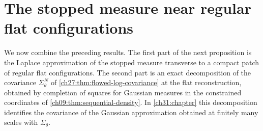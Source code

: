 \section{The stopped measure near regular flat configurations}\label{ch27:sec:terminal}

We now combine the preceding results. The first part of the next proposition is the Laplace approximation of the stopped measure transverse to a compact patch of regular flat configurations. The second part is an exact decomposition of the covariance $\Sigma_\theta^N$ of \cref{ch27:thm:flowed-log-covariance} at the flat reconstruction, obtained by completion of squares for Gaussian measures in the constrained coordinates of \cref{ch09:thm:sequential-density}. In \cref{ch31:chapter} this decomposition identifies the covariance of the Gaussian approximation obtained at finitely many scales with $\Sigma_\theta$.


